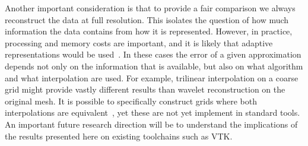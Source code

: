 Another important consideration is that to provide a fair comparison we always reconstruct the data
at full resolution. This isolates the question of how much information the data contains from how it
is represented. However, in practice, processing and memory costs are important, and it is likely
that adaptive representations would be used~\cite{gigavoxels,Gobbetti2008,vdb2013}. In these cases
the error of a given approximation depends not only on the information that is available, but also
on what algorithm and what interpolation are used. For example, trilinear interpolation on a coarse
grid might provide vastly different results than wavelet reconstruction on the original mesh. It is
possible to specifically construct grids where both interpolations are equivalent~\cite{weiss}, yet
these are not yet implement in standard tools. An important future research direction will be to
understand the implications of the results presented here on existing toolchains such as VTK.

